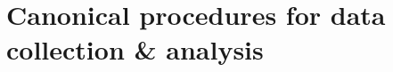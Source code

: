 \documentclass[sigconf]{acmart}
\begin{document}
%
%
%
%
%
%
%


\section{Canonical procedures for data collection \& analysis}
\end{document}
